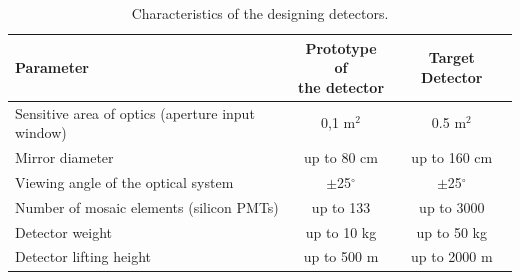 \documentclass[a4paper]{jpconf}
\begin{document}
\begin{table}[tb]
\centering
\caption{Characteristics of the designing detectors.}
\label{tab:statistics}
\begin{tabular}{| l |c|c|}
\hline
\textbf{Parameter}  & \parbox[t][.8cm]{3cm}{\textbf{Prototype of\\the detector}} & \textbf{Target Detector} \\ [1.5ex]
\hline
Sensitive area of optics (aperture input window) & 0,1 m$^2$ &  0.5 m$^2$\\ 
\hline
Mirror diameter & up to 80 cm &  up to 160 cm\\
\hline
Viewing angle of the optical system & $\pm$25$^\circ$ & $\pm$25$^\circ$ \\
\hline
Number of mosaic elements (silicon PMTs) & up to 133 & up to 3000 \\
\hline
Detector weight & up to 10 kg & up to 50 kg \\
\hline
Detector lifting height & up to 500 m & up to 2000 m \\
\hline
\end{tabular}
\end{table}
\end{document}
